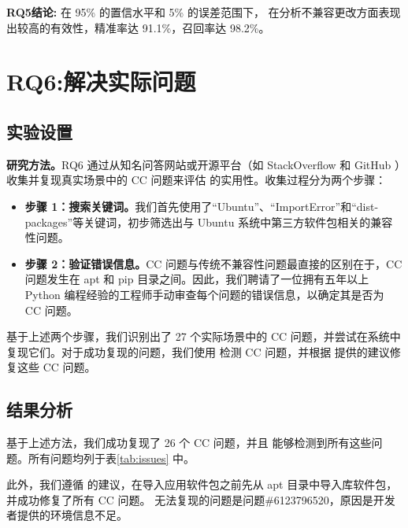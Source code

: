 \begin{tcolorbox}[boxrule=1pt,boxsep=1pt,left=2pt,right=2pt,top=2pt,bottom=2pt]
	\small
	\textcolor{red}{} \noindent\textbf{RQ5结论:} 
	在 95\% 的置信水平和 5\% 的误差范围下，\tool{} 在分析不兼容更改方面表现出较高的有效性，精准率达 91.1\%，召回率达 98.2\%。
\end{tcolorbox} 

\section{RQ6:解决实际问题}
\subsection{实验设置}
\textbf{研究方法。}RQ6 通过从知名问答网站或开源平台（如 StackOverflow  和 GitHub ）收集并复现真实场景中的 CC 问题来评估 \tool{} 的实用性。收集过程分为两个步骤：
\begin{itemize}
	\item \textbf{步骤 1：搜索关键词。}我们首先使用了“Ubuntu”、“ImportError”和“dist-packages”等关键词，初步筛选出与 Ubuntu 系统中第三方软件包相关的兼容性问题。
	\item \textbf{步骤 2：验证错误信息。}CC 问题与传统不兼容性问题最直接的区别在于，CC 问题发生在 apt 和 pip 目录之间。因此，我们聘请了一位拥有五年以上 Python 编程经验的工程师手动审查每个问题的错误信息，以确定其是否为 CC 问题。
\end{itemize}
基于上述两个步骤，我们识别出了 27 个实际场景中的 CC 问题，并尝试在系统中复现它们。对于成功复现的问题，我们使用 \tool{} 检测 CC 问题，并根据 \tool{} 提供的建议修复这些 CC 问题。
\subsection{结果分析}
基于上述方法，我们成功复现了 26 个 CC 问题，并且 \tool{} 能够检测到所有这些问题。所有问题均列于表\ref{tab:issues} 中。

此外，我们遵循\tool{} 的建议，在导入应用软件包之前先从 apt 目录中导入库软件包，并成功修复了所有 CC 问题。
无法复现的问题是问题\#6123796520，原因是开发者提供的环境信息不足。

